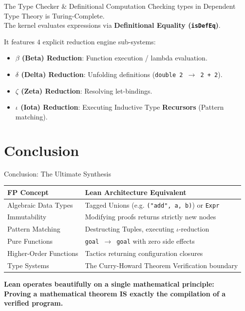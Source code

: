 \documentclass[aspectratio=169, 10pt]{beamer}
\begin{document}
\begin{frame}{The Type Checker \& Definitional Computation}
    Checking types in Dependent Type Theory is Turing-Complete. \\
    The kernel evaluates expressions via \textbf{Definitional Equality (\texttt{isDefEq})}.
    
    \vspace{1em}
    It features $4$ explicit reduction engine sub-systems:
    \begin{itemize}
        \item \textbf{$\beta$ (Beta) Reduction}: Function execution / lambda evaluation.
        \item \textbf{$\delta$ (Delta) Reduction}: Unfolding definitions (\texttt{double 2 $\rightarrow$ 2 + 2}).
        \item \textbf{$\zeta$ (Zeta) Reduction}: Resolving let-bindings.
        \item \textbf{$\iota$ (Iota) Reduction}: Executing Inductive Type \textbf{Recursors} (Pattern matching).
    \end{itemize}
\end{frame}

\section{Conclusion}

\begin{frame}{Conclusion: The Ultimate Synthesis}
    \begin{table}
        \centering
        \begin{tabular}{ll}
            \toprule
            \textbf{FP Concept} & \textbf{Lean Architecture Equivalent} \\
            \midrule
            Algebraic Data Types & Tagged Unions (e.g. \texttt{("add", a, b)}) or \texttt{Expr} \\
            Immutability & Modifying proofs returns strictly new nodes \\
            Pattern Matching & Destructing Tuples, executing $\iota$-reduction \\
            Pure Functions & \texttt{goal $\rightarrow$ goal} with zero side effects \\
            Higher-Order Functions & Tactics returning configuration closures \\
            Type Systems & The Curry-Howard Theorem Verification boundary \\
            \bottomrule
        \end{tabular}
    \end{table}
    
    \vspace{1em}
    \begin{center}
        \textbf{Lean operates beautifully on a single mathematical principle: \\ Proving a mathematical theorem IS exactly the compilation of a verified program.}
    \end{center}
\end{frame}
\end{document}
